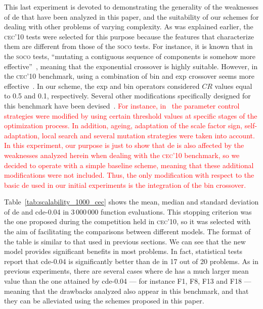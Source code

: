 \documentclass[review,3p]{elsarticle}
\newcommand{\CDE}{c{\sc de}}
\newcommand{\DE}{{\sc de}}
\begin{document}


This last experiment is devoted to demonstrating the generality of the weaknesses of \DE{} that have been analyzed in this
paper, and the suitability of our schemes for dealing with other problems of varying complexity.
%
As was explained earlier, the \textsc{cec'10} tests were selected for this purpose
because the features that characterize them are different from those of the \textsc{soco} tests.
%
For instance, it is known that in the \textsc{soco} tests, ``mutating a contiguous sequence of components is somehow more effective''~\cite{Zhao:13}, meaning
that the exponential crossover is highly suitable. %
%
However, in the \textsc{cec'10} benchmark, using a combination of bin and exp crossover seems more effective~\cite{Brest:10,Wang:10}.
%
In our scheme, the exp and bin operators considered $CR$ values equal to 0.5 and 0.1, respectively.
%
Several other modifications specifically designed for this benchmark have been devised~\cite{Brest:10,Brest:12}.
%
\textcolor{red}{
For instance, in~\cite{Brest:12} the parameter control strategies were modified by using certain threshold values at specific stages
of the optimization process.
%
In addition, ageing, adaptation of the scale factor sign, self-adaptation, local search and several mutation strategies were taken into account.
%
In this experiment, our purpose is just to show that \DE{} is also affected by the weaknesses analyzed herein when dealing with the \textsc{cec'10} benchmark,
so we decided to operate with a simple baseline scheme, meaning that these additional modifications were not included.
%
Thus, the only modification with respect to the basic \DE{} used in our initial experiments is the integration of the bin crossover.
}

Table~\ref{tab:scalability_1000_cec} shows the mean, median and standard deviation
of \DE{} and \CDE{}-0.04 in 3$\,$000$\,$000 function evaluations.
%
This stopping criterion was the one proposed during the competition held in \textsc{cec'10}, so it was selected with the aim of facilitating
the comparisons between different models.
%
The format of the table is similar to that used in previous sections.
%
We can see that the new model provides significant benefits in most problems.
%
In fact, statistical tests report that \CDE{}-0.04 is significantly better than \DE{} in 17 out of 20 problems.
%
As in previous experiments, there are several cases where \DE{} has a much larger mean value than the one attained by \CDE{}-0.04
--- for instance F1, F8, F13 and F18 --- meaning
that the drawbacks analyzed also appear in this benchmark, and that they can be alleviated using the schemes proposed in this paper.
\end{document}
